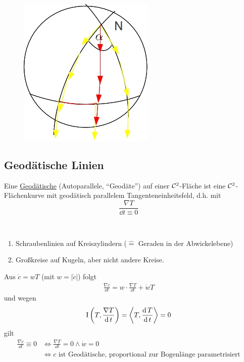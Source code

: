 \begin{bsp}
\begin{figure}[ht]
 \centering
\includegraphics[scale=0.3]{Bilder/Bsp13}
\end{figure}
\end{bsp}

\subsection{Geodätische Linien}
\begin{definition}
 Eine \uline{Geodätische} (Autoparallele, ``Geodäte'') auf einer \(\mathcal{C}^2\)-Fläche ist eine \(\mathcal{C}^2\)-Flächenkurve mit geodätisch parallelem Tangenteneinheitsfeld, d.h. mit
 \[
  \boxed{\frac{\nabla T}{\dd t \equiv 0}}
 \]
\end{definition}
\begin{bsp} \(\)
 \begin{enumerate}
  \item Schraubenlinien auf Kreiszylindern (\(\widehat{=}\) Geraden in der Abwickelebene)
  \item Großkreise auf Kugeln, aber nicht andere Kreise.
 \end{enumerate}
\end{bsp}
Aus \(\dot c = w T\) (mit \(w = |\dot c|\)) folgt 
\begin{align*}
 \frac{\nabla \dot c}{\dd t} = w \cdot \frac{\nabla T}{\dd t} + \dot w T
\end{align*}
und wegen 
\[ 
\Rom 1 \left(T, \frac{\nabla T}{\dd t}\right) = \left\langle T, \frac{\dd T}{\dd t} \right\rangle = 0
\]
gilt
 \begin{align*}
  \frac{\nabla \dot c}{\dd t} \equiv 0 &\Leftrightarrow \frac{\nabla T}{\dd t} = 0 \land \dot w = 0 \\
  &\Leftrightarrow c \text{ ist Geodätische, proportional zur Bogenlänge parametrisiert}
 \end{align*}

